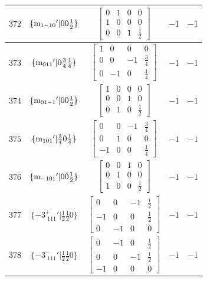 \documentclass[fleqn,8pt]{jsarticle}
\begin{document}
\begin{longtable}{ccccc}
$ 372 $ & $ \{{\rm m}_{1-10}{}'|0 0 \frac{1}{2}\} $ & $ \begin{bmatrix} 0 & 1 & 0 & 0 \\ 1 & 0 & 0 & 0 \\ 0 & 0 & 1 & \frac{1}{2} \end{bmatrix} $ & $ -1 $ & $ -1 $ \\ \hline
$ 373 $ & $ \{{\rm m}_{011}{}'|0 \frac{3}{4} \frac{1}{4}\} $ & $ \begin{bmatrix} 1 & 0 & 0 & 0 \\ 0 & 0 & -1 & \frac{3}{4} \\ 0 & -1 & 0 & \frac{1}{4} \end{bmatrix} $ & $ -1 $ & $ -1 $ \\ \hline
$ 374 $ & $ \{{\rm m}_{01-1}{}'|0 0 \frac{1}{2}\} $ & $ \begin{bmatrix} 1 & 0 & 0 & 0 \\ 0 & 0 & 1 & 0 \\ 0 & 1 & 0 & \frac{1}{2} \end{bmatrix} $ & $ -1 $ & $ -1 $ \\ \hline
$ 375 $ & $ \{{\rm m}_{101}{}'|\frac{3}{4} 0 \frac{1}{4}\} $ & $ \begin{bmatrix} 0 & 0 & -1 & \frac{3}{4} \\ 0 & 1 & 0 & 0 \\ -1 & 0 & 0 & \frac{1}{4} \end{bmatrix} $ & $ -1 $ & $ -1 $ \\ \hline
$ 376 $ & $ \{{\rm m}_{-101}{}'|0 0 \frac{1}{2}\} $ & $ \begin{bmatrix} 0 & 0 & 1 & 0 \\ 0 & 1 & 0 & 0 \\ 1 & 0 & 0 & \frac{1}{2} \end{bmatrix} $ & $ -1 $ & $ -1 $ \\ \hline
$ 377 $ & $ \{-3^{+}_{\,\,111}{}'|\frac{1}{2} \frac{1}{2} 0\} $ & $ \begin{bmatrix} 0 & 0 & -1 & \frac{1}{2} \\ -1 & 0 & 0 & \frac{1}{2} \\ 0 & -1 & 0 & 0 \end{bmatrix} $ & $ -1 $ & $ -1 $ \\ \hline
$ 378 $ & $ \{-3^{-}_{\,\,111}{}'|\frac{1}{2} \frac{1}{2} 0\} $ & $ \begin{bmatrix} 0 & -1 & 0 & \frac{1}{2} \\ 0 & 0 & -1 & \frac{1}{2} \\ -1 & 0 & 0 & 0 \end{bmatrix} $ & $ -1 $ & $ -1 $ \\ \hline

\end{longtable}
\end{document}
